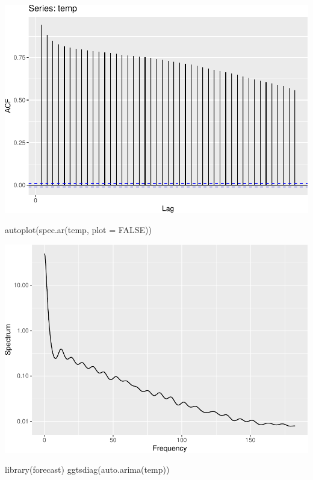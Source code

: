 \documentclass[
  paper=a4,
  ,captions=tableheading
]{scrartcl}
\newenvironment{Shaded}{\begin{snugshade}}{\end{snugshade}}
\newcommand{\AttributeTok}[1]{\textcolor[rgb]{0.77,0.63,0.00}{#1}}
\newcommand{\ConstantTok}[1]{\textcolor[rgb]{0.00,0.00,0.00}{#1}}
\newcommand{\FunctionTok}[1]{\textcolor[rgb]{0.00,0.00,0.00}{#1}}
\newcommand{\NormalTok}[1]{#1}
\begin{document}
\includegraphics{Haskell_files/figure-latex/unnamed-chunk-62-1.pdf}

\begin{Shaded}
\begin{Highlighting}[]
\FunctionTok{autoplot}\NormalTok{(}\FunctionTok{spec.ar}\NormalTok{(temp, }\AttributeTok{plot =} \ConstantTok{FALSE}\NormalTok{))}
\end{Highlighting}
\end{Shaded}

\includegraphics{Haskell_files/figure-latex/unnamed-chunk-63-1.pdf}

\begin{Shaded}
\begin{Highlighting}[]
\FunctionTok{library}\NormalTok{(forecast)}
\FunctionTok{ggtsdiag}\NormalTok{(}\FunctionTok{auto.arima}\NormalTok{(temp))}
\end{Highlighting}
\end{Shaded}
\end{document}
